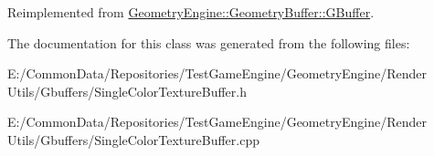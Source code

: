 Reimplemented from \mbox{\hyperlink{class_geometry_engine_1_1_geometry_buffer_1_1_g_buffer_a9f20eb78703ef048d59a54f90ee09f25}{Geometry\+Engine\+::\+Geometry\+Buffer\+::\+G\+Buffer}}.



The documentation for this class was generated from the following files\+:\begin{DoxyCompactItemize}
\item 
E\+:/\+Common\+Data/\+Repositories/\+Test\+Game\+Engine/\+Geometry\+Engine/\+Render Utils/\+Gbuffers/Single\+Color\+Texture\+Buffer.\+h\item 
E\+:/\+Common\+Data/\+Repositories/\+Test\+Game\+Engine/\+Geometry\+Engine/\+Render Utils/\+Gbuffers/Single\+Color\+Texture\+Buffer.\+cpp\end{DoxyCompactItemize}
